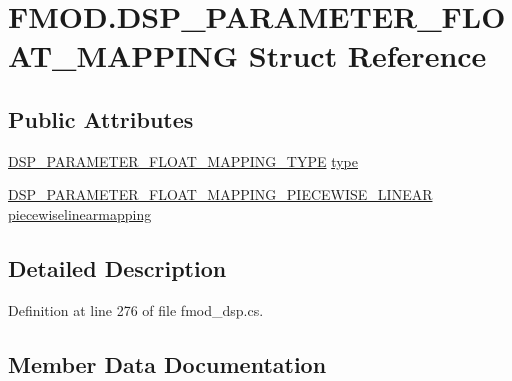 \hypertarget{struct_f_m_o_d_1_1_d_s_p___p_a_r_a_m_e_t_e_r___f_l_o_a_t___m_a_p_p_i_n_g}{}\section{F\+M\+O\+D.\+D\+S\+P\+\_\+\+P\+A\+R\+A\+M\+E\+T\+E\+R\+\_\+\+F\+L\+O\+A\+T\+\_\+\+M\+A\+P\+P\+I\+NG Struct Reference}
\label{struct_f_m_o_d_1_1_d_s_p___p_a_r_a_m_e_t_e_r___f_l_o_a_t___m_a_p_p_i_n_g}
\subsection*{Public Attributes}
\begin{DoxyCompactItemize}
\item 
\hyperlink{namespace_f_m_o_d_afd26b4f5904412578911d16a5d3d904f}{D\+S\+P\+\_\+\+P\+A\+R\+A\+M\+E\+T\+E\+R\+\_\+\+F\+L\+O\+A\+T\+\_\+\+M\+A\+P\+P\+I\+N\+G\+\_\+\+T\+Y\+PE} \hyperlink{struct_f_m_o_d_1_1_d_s_p___p_a_r_a_m_e_t_e_r___f_l_o_a_t___m_a_p_p_i_n_g_aba30eb7f8308eb30680273f2f90458ef}{type}
\item 
\hyperlink{struct_f_m_o_d_1_1_d_s_p___p_a_r_a_m_e_t_e_r___f_l_o_a_t___m_a_p_p_i_n_g___p_i_e_c_e_w_i_s_e___l_i_n_e_a_r}{D\+S\+P\+\_\+\+P\+A\+R\+A\+M\+E\+T\+E\+R\+\_\+\+F\+L\+O\+A\+T\+\_\+\+M\+A\+P\+P\+I\+N\+G\+\_\+\+P\+I\+E\+C\+E\+W\+I\+S\+E\+\_\+\+L\+I\+N\+E\+AR} \hyperlink{struct_f_m_o_d_1_1_d_s_p___p_a_r_a_m_e_t_e_r___f_l_o_a_t___m_a_p_p_i_n_g_a36009fbbda58bf26f04cefbeadc04eb3}{piecewiselinearmapping}
\end{DoxyCompactItemize}


\subsection{Detailed Description}


Definition at line 276 of file fmod\+\_\+dsp.\+cs.



\subsection{Member Data Documentation}
\mbox{\label{struct_f_m_o_d_1_1_d_s_p___p_a_r_a_m_e_t_e_r___f_l_o_a_t___m_a_p_p_i_n_g_a36009fbbda58bf26f04cefbeadc04eb3}} 
